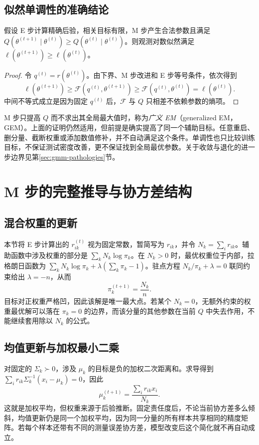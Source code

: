 \documentclass[UTF8,12pt,a4paper,fontset=fandol]{ctexart}
\begin{document}
\subsection{似然单调性的准确结论}
\begin{proposition}[EM 的单调性]
假设 E 步计算精确后验，相关目标有限，M 步产生合法参数且满足 $Q(\theta^{(t+1)}\mid\theta^{(t)})\geq Q(\theta^{(t)}\mid\theta^{(t)})$。则观测对数似然满足 $\ell(\theta^{(t+1)})\geq\ell(\theta^{(t)})$。
\end{proposition}
\begin{proof}
令 $q^{(t)}=r(\theta^{(t)})$。由下界、M 步改进和 E 步等号条件，依次得到
\[
\ell(\theta^{(t+1)})\geq\mathcal F(q^{(t)},\theta^{(t+1)})
\geq\mathcal F(q^{(t)},\theta^{(t)})=\ell(\theta^{(t)}).
\]
中间不等式成立是因为固定 $q^{(t)}$ 后，$\mathcal F$ 与 $Q$ 只相差不依赖参数的熵项。
\end{proof}

M 步只提高 $Q$ 而不求出其全局最大值时，称为\emph{广义 EM}（generalized EM，GEM）。上面的证明仍然适用，但前提是确实提高了同一个辅助目标。任意重启、删分量、截断权重或添加数值修补，并不自动满足这个条件。单调性也只比较训练目标，不保证测试密度改善，更不保证找到全局最优参数。关于收敛与退化的进一步边界见第\ref{sec:gmm-pathologies}节。

\section{M 步的完整推导与协方差结构}
\label{sec:gmm-m-step}

\subsection{混合权重的更新}
本节将 E 步计算出的 $r_{ik}^{(t)}$ 视为固定常数，暂简写为 $r_{ik}$，并令 $N_k=\sum_i r_{ik}$。辅助函数中涉及权重的部分是 $\sum_kN_k\log\pi_k$。在 $N_k>0$ 时，最优权重位于内部，拉格朗日函数为 $\sum_kN_k\log\pi_k+\lambda(\sum_k\pi_k-1)$。驻点方程 $N_k/\pi_k+\lambda=0$ 联同约束给出 $\lambda=-n$，从而
\begin{equation}
\pi_k^{(t+1)}=\frac{N_k}{n}.
\label{eq:gmm-weight-update}
\end{equation}
目标对正权重严格凹，因此该解是唯一最大点。若某个 $N_k=0$，无额外约束的权重最优解可以落在 $\pi_k=0$ 的边界，而该分量的其他参数在当前 $Q$ 中失去作用，不能继续套用除以 $N_k$ 的公式。

\subsection{均值更新与加权最小二乘}
对固定的 $\Sigma_k\succ0$，涉及 $\mu_k$ 的目标是负的加权二次距离和。求导得到 $\sum_i r_{ik}\Sigma_k^{-1}(x_i-\mu_k)=0$，因此
\begin{equation}
\mu_k^{(t+1)}=\frac{\sum_i r_{ik}x_i}{N_k}.
\label{eq:gmm-mean-update}
\end{equation}
这就是加权平均，但权重来源于后验推断。固定责任度后，不论当前协方差多么倾斜，均值更新仍是同一个加权平均，因为同一分量的所有样本共享相同的精度矩阵。若每个样本还带有不同的测量误差协方差，模型改变后这个简化就不再自动成立。
\end{document}
